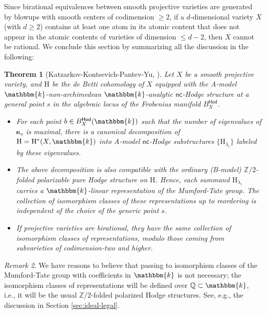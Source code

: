\documentclass[12pt,a4paper]{amsart}
\newtheorem{theorem}{Theorem}[section]
\theoremstyle{definition}
\theoremstyle{remark}
\newtheorem{remark}[theorem]{Remark}
\begin{document}
Since birational equivalences between smooth projective varieties are generated by blowups with smooth centers of codimension \( \geq 2\), if a \(d\)-dimensional variety \(X\) (with \(d \geq 2\)) contains at least one atom in its atomic content that does not appear in the atomic contents of varieties of dimension \(\leq d - 2\), then \(X\) cannot be rational. 
We conclude this section by summarizing all the discussion in the following:
\begin{theorem}[Katzarkov-Kontsevich-Pantev-Yu, \cite{katzarkovpantevyu}] \label{thm:Katzarkov-Kontsevich-Pantev-Yu} Let $X$ be a smooth projective variety, and $\mathrm{H}$ be the de Betti cohomology of $X$ equipped with the A-model $\mathbbm{k}$-non-archimedean $\mathbbm{k}$-analytic $\mathsf{nc}$-Hodge structure at a general point $s$ in the algebraic locus of the Frobenius manifold $B_X^{\mathsf{Hod}}$.
  \begin{itemize}
  \item For each point $b\in B_X^{\mathsf{Hod}}(\mathbbm{k})$ such that the number of eigenvalues of $\boldsymbol{\kappa}_s$ is maximal,   there is a canonical decomposition of $\mathrm{H}=\mathrm{H}^{\ast}(X,\mathbbm{k})$ into
    $A$-model $\mathsf{nc}$-Hodge substructures $\{\mathrm{H}_{\lambda_i}\}$ labeled by
    these eigenvalues.
  \item The above decomposition is also compatible with the
ordinary (B-model) $\mathbb Z/2$-folded polarizable pure Hodge structure on
$\mathrm{H}$. Hence, each summand $\mathrm{H}_{\lambda_i}$ carries a $\mathbbm{k}$-linear representation of the Mumford-Tate group. The collection of isomorphism classes of these representations up to reordering is independent
of the choice of the generic point $s$.
  \item If projective varieties are birational, they have the same collection of isomorphism classes of representations, modulo those coming
from subvarieties of codimension-two and higher.
 \end{itemize}
\end{theorem}
\begin{remark}
    We have reasons to believe that passing to isomorphism classes of the Mumford-Tate group with coefficients in $\mathbbm{k}$ is not necessary; the isomorphism classes of representations will be defined over $\mathbb Q\subset \mathbbm{k}$, i.e., it will be the usual $\mathbb
Z/2$-folded polarized Hodge structures. See, e.g., the discussion in Section \ref{sec:ideal-legal}.\label{rem:Q-not-K}
\end{remark}
\end{document}
